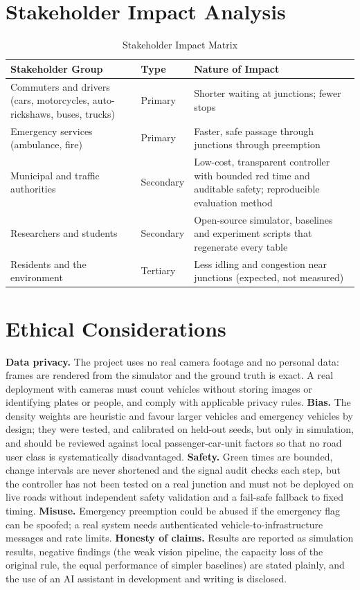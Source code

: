 \section{Stakeholder Impact Analysis}

\begin{table}[H]
\centering
\caption{Stakeholder Impact Matrix}
\label{tab:stakeholders}
\small
\begin{tabular}{@{}p{4cm}p{2.5cm}p{8cm}@{}}
\toprule
\textbf{Stakeholder Group} & \textbf{Type} & \textbf{Nature of Impact} \\
\midrule
Commuters and drivers (cars, motorcycles, auto-rickshaws, buses, trucks) & Primary & Shorter waiting at junctions; fewer stops \\
Emergency services (ambulance, fire) & Primary & Faster, safe passage through junctions through preemption \\
Municipal and traffic authorities & Secondary & Low-cost, transparent controller with bounded red time and auditable safety; reproducible evaluation method \\
Researchers and students & Secondary & Open-source simulator, baselines and experiment scripts that regenerate every table \\
Residents and the environment & Tertiary & Less idling and congestion near junctions (expected, not measured) \\
\bottomrule
\end{tabular}
\end{table}

\section{Ethical Considerations}
\textbf{Data privacy.} The project uses no real camera footage and no personal data: frames are rendered from the simulator and the ground truth is exact. A real deployment with cameras must count vehicles without storing images or identifying plates or people, and comply with applicable privacy rules. \textbf{Bias.} The density weights are heuristic and favour larger vehicles and emergency vehicles by design; they were tested, and calibrated on held-out seeds, but only in simulation, and should be reviewed against local passenger-car-unit factors so that no road user class is systematically disadvantaged. \textbf{Safety.} Green times are bounded, change intervals are never shortened and the signal audit checks each step, but the controller has not been tested on a real junction and must not be deployed on live roads without independent safety validation and a fail-safe fallback to fixed timing. \textbf{Misuse.} Emergency preemption could be abused if the emergency flag can be spoofed; a real system needs authenticated vehicle-to-infrastructure messages and rate limits. \textbf{Honesty of claims.} Results are reported as simulation results, negative findings (the weak vision pipeline, the capacity loss of the original rule, the equal performance of simpler baselines) are stated plainly, and the use of an AI assistant in development and writing is disclosed.
